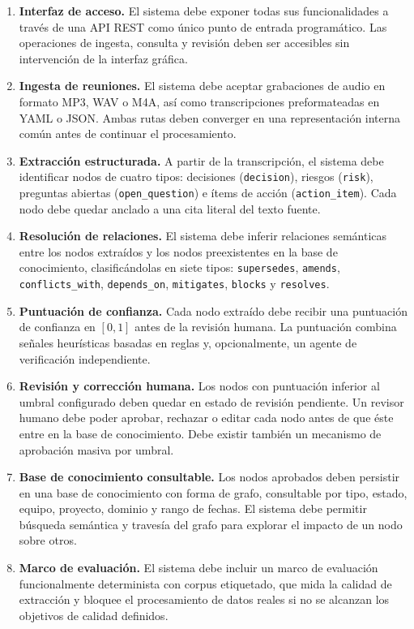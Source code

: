 \begin{enumerate}
  \item \textbf{Interfaz de acceso.} El sistema debe exponer todas sus funcionalidades a través
        de una \ac{API} REST como único punto de entrada programático. Las operaciones de ingesta,
        consulta y revisión deben ser accesibles sin intervención de la interfaz gráfica.

  \item \textbf{Ingesta de reuniones.} El sistema debe aceptar grabaciones de audio en formato
        MP3, WAV o M4A, así como transcripciones preformateadas en YAML o JSON. Ambas rutas deben
        converger en una representación interna común antes de continuar el procesamiento.

  \item \textbf{Extracción estructurada.} A partir de la transcripción, el sistema debe identificar
        nodos de cuatro tipos: decisiones (\texttt{decision}), riesgos (\texttt{risk}), preguntas
        abiertas (\texttt{open\_question}) e ítems de acción (\texttt{action\_item}). Cada nodo
        debe quedar anclado a una cita literal del texto fuente.

  \item \textbf{Resolución de relaciones.} El sistema debe inferir relaciones semánticas entre los
        nodos extraídos y los nodos preexistentes en la base de conocimiento, clasificándolas en
        siete tipos: \texttt{supersedes}, \texttt{amends}, \texttt{conflicts\_with},
        \texttt{depends\_on}, \texttt{mitigates}, \texttt{blocks} y \texttt{resolves}.

  \item \textbf{Puntuación de confianza.} Cada nodo extraído debe recibir una puntuación de
        confianza en $[0, 1]$ antes de la revisión humana. La puntuación combina señales
        heurísticas basadas en reglas y, opcionalmente, un agente de verificación independiente.

  \item \textbf{Revisión y corrección humana.} Los nodos con puntuación inferior al umbral
        configurado deben quedar en estado de revisión pendiente. Un revisor humano debe poder
        aprobar, rechazar o editar cada nodo antes de que éste entre en la base de conocimiento.
        Debe existir también un mecanismo de aprobación masiva por umbral.

  \item \textbf{Base de conocimiento consultable.} Los nodos aprobados deben persistir en una
        base de conocimiento con forma de grafo, consultable por tipo, estado, equipo, proyecto,
        dominio y rango de fechas. El sistema debe permitir búsqueda semántica y travesía del
        grafo para explorar el impacto de un nodo sobre otros.

  \item \textbf{Marco de evaluación.} El sistema debe incluir un marco de evaluación funcionalmente
        determinista con corpus etiquetado, que mida la calidad de extracción y bloquee el procesamiento
        de datos reales si no se alcanzan los objetivos de calidad definidos.

\end{enumerate}

